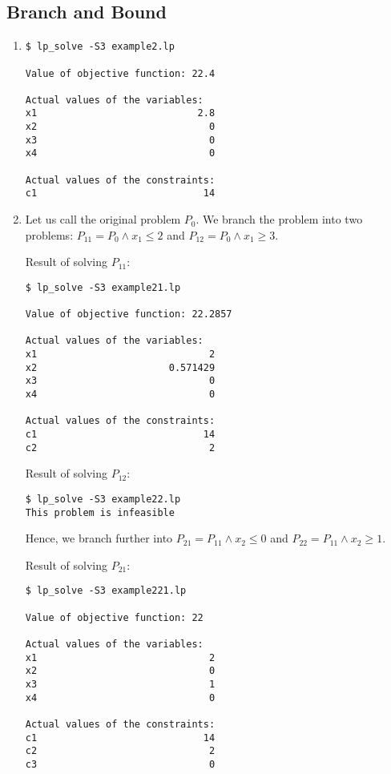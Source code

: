 \documentclass[a4paper, oneside]{scrartcl}
\begin{document}
\subsection{Branch and Bound}

\begin{enumerate}
  \item 
\begin{verbatim}
$ lp_solve -S3 example2.lp 

Value of objective function: 22.4

Actual values of the variables:
x1                            2.8
x2                              0
x3                              0
x4                              0

Actual values of the constraints:
c1                             14
\end{verbatim}
  \item 
Let us call the original problem $P_0$.
We branch the problem into two problems: $P_{11} = P_0 \wedge x_1 \leq 2$ and
$P_{12} = P_0 \wedge x_1 \geq 3$. 

Result of solving $P_{11}$:
\begin{verbatim}
$ lp_solve -S3 example21.lp 

Value of objective function: 22.2857

Actual values of the variables:
x1                              2
x2                       0.571429
x3                              0
x4                              0

Actual values of the constraints:
c1                             14
c2                              2
\end{verbatim}

Result of solving $P_{12}$:
\begin{verbatim}
$ lp_solve -S3 example22.lp 
This problem is infeasible
\end{verbatim}

Hence, we branch further into $P_{21} = P_{11} \wedge x_2 \leq 0$ and $P_{22} =
P_{11} \wedge x_2 \geq 1$.

Result of solving $P_{21}$:
\begin{verbatim}
$ lp_solve -S3 example221.lp 

Value of objective function: 22

Actual values of the variables:
x1                              2
x2                              0
x3                              1
x4                              0

Actual values of the constraints:
c1                             14
c2                              2
c3                              0
\end{verbatim}


\end{enumerate}
\end{document}
